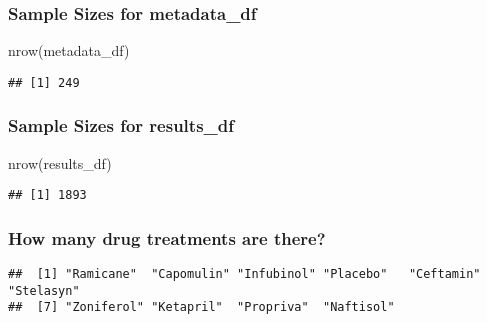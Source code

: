 \documentclass[
]{article}
\newenvironment{Shaded}{\begin{snugshade}}{\end{snugshade}}
\newcommand{\FunctionTok}[1]{\textcolor[rgb]{0.00,0.00,0.00}{#1}}
\newcommand{\NormalTok}[1]{#1}
\newcommand{\OtherTok}[1]{\textcolor[rgb]{0.56,0.35,0.01}{#1}}
\newcommand{\SpecialCharTok}[1]{\textcolor[rgb]{0.00,0.00,0.00}{#1}}
\begin{document}
\hypertarget{sample-sizes-for-metadata_df}{%
\subsubsection{Sample Sizes for
metadata\_df}\label{sample-sizes-for-metadata_df}}

\begin{Shaded}
\begin{Highlighting}[]
\FunctionTok{nrow}\NormalTok{(metadata\_df)}
\end{Highlighting}
\end{Shaded}

\begin{verbatim}
## [1] 249
\end{verbatim}

\hypertarget{sample-sizes-for-results_df}{%
\subsubsection{Sample Sizes for
results\_df}\label{sample-sizes-for-results_df}}

\begin{Shaded}
\begin{Highlighting}[]
\FunctionTok{nrow}\NormalTok{(results\_df)}
\end{Highlighting}
\end{Shaded}

\begin{verbatim}
## [1] 1893
\end{verbatim}

\hypertarget{how-many-drug-treatments-are-there}{%
\subsubsection{How many drug treatments are
there?}\label{how-many-drug-treatments-are-there}}

\begin{Shaded}
\end{Shaded}

\begin{verbatim}
##  [1] "Ramicane"  "Capomulin" "Infubinol" "Placebo"   "Ceftamin"  "Stelasyn" 
##  [7] "Zoniferol" "Ketapril"  "Propriva"  "Naftisol"
\end{verbatim}
\end{document}
